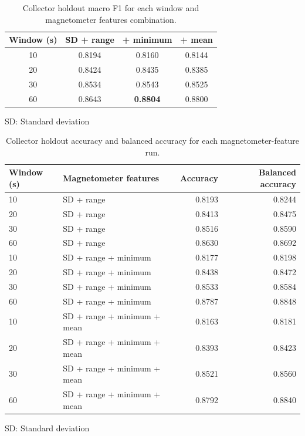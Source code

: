 \begin{table}[htbp]
\centering
\caption{Collector holdout macro F1 for each window and magnetometer features combination.}
\label{tab:aws-run-a46cc6a0-trial-f1}
\begin{threeparttable}
\begin{tabular}{|c|c|c|c|}
\hline
\textbf{Window (s)} & \textbf{SD\tnote{1} + range} & \textbf{+ minimum} & \textbf{+ mean} \\
\hline
10 & 0.8194 & 0.8160 & 0.8144 \\
20 & 0.8424 & 0.8435 & 0.8385 \\
30 & 0.8534 & 0.8543 & 0.8525 \\
60 & 0.8643 & \textbf{0.8804} & 0.8800 \\
\hline
\end{tabular}
\begin{tablenotes}
\item[1] SD: Standard deviation
\end{tablenotes}
\end{threeparttable}
\end{table}

\begin{table}[htbp]
\centering
\caption{Collector holdout accuracy and balanced accuracy for each magnetometer-feature run.}
\label{tab:aws-run-a46cc6a0-trial-accuracy}
\begin{threeparttable}
\small
\begin{tabular}{llrr}
\hline
\textbf{Window (s)} & \textbf{Magnetometer features} & \textbf{Accuracy} & \textbf{Balanced accuracy} \\
\hline
10 & SD\tnote{1} + range & 0.8193 & 0.8244 \\
20 & SD + range & 0.8413 & 0.8475 \\
30 & SD + range & 0.8516 & 0.8590 \\
60 & SD + range & 0.8630 & 0.8692 \\
10 & SD + range + minimum & 0.8177 & 0.8198 \\
20 & SD + range + minimum & 0.8438 & 0.8472 \\
30 & SD + range + minimum & 0.8533 & 0.8584 \\
60 & SD + range + minimum & 0.8787 & 0.8848 \\
10 & SD + range + minimum + mean & 0.8163 & 0.8181 \\
20 & SD + range + minimum + mean & 0.8393 & 0.8423 \\
30 & SD + range + minimum + mean & 0.8521 & 0.8560 \\
60 & SD + range + minimum + mean & 0.8792 & 0.8840 \\
\hline
\end{tabular}
\begin{tablenotes}
\item[1] SD: Standard deviation
\end{tablenotes}
\end{threeparttable}
\end{table}

